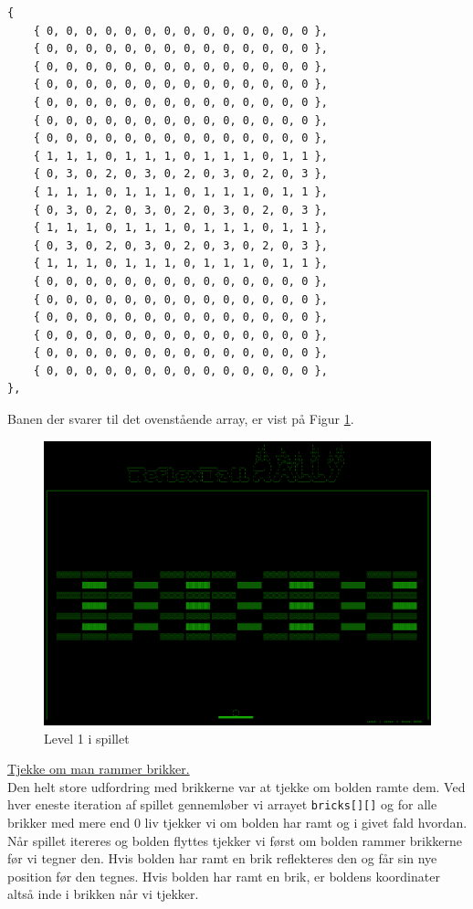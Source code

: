 \begin{lstlisting}
{ 
	{ 0, 0, 0, 0, 0, 0, 0, 0, 0, 0, 0, 0, 0, 0 },
	{ 0, 0, 0, 0, 0, 0, 0, 0, 0, 0, 0, 0, 0, 0 },
	{ 0, 0, 0, 0, 0, 0, 0, 0, 0, 0, 0, 0, 0, 0 },
	{ 0, 0, 0, 0, 0, 0, 0, 0, 0, 0, 0, 0, 0, 0 },
	{ 0, 0, 0, 0, 0, 0, 0, 0, 0, 0, 0, 0, 0, 0 },
	{ 0, 0, 0, 0, 0, 0, 0, 0, 0, 0, 0, 0, 0, 0 },
	{ 0, 0, 0, 0, 0, 0, 0, 0, 0, 0, 0, 0, 0, 0 },
	{ 1, 1, 1, 0, 1, 1, 1, 0, 1, 1, 1, 0, 1, 1 },
	{ 0, 3, 0, 2, 0, 3, 0, 2, 0, 3, 0, 2, 0, 3 },
	{ 1, 1, 1, 0, 1, 1, 1, 0, 1, 1, 1, 0, 1, 1 },
	{ 0, 3, 0, 2, 0, 3, 0, 2, 0, 3, 0, 2, 0, 3 },		
	{ 1, 1, 1, 0, 1, 1, 1, 0, 1, 1, 1, 0, 1, 1 },
	{ 0, 3, 0, 2, 0, 3, 0, 2, 0, 3, 0, 2, 0, 3 },
	{ 1, 1, 1, 0, 1, 1, 1, 0, 1, 1, 1, 0, 1, 1 },		
	{ 0, 0, 0, 0, 0, 0, 0, 0, 0, 0, 0, 0, 0, 0 },
	{ 0, 0, 0, 0, 0, 0, 0, 0, 0, 0, 0, 0, 0, 0 },
	{ 0, 0, 0, 0, 0, 0, 0, 0, 0, 0, 0, 0, 0, 0 },
	{ 0, 0, 0, 0, 0, 0, 0, 0, 0, 0, 0, 0, 0, 0 },
	{ 0, 0, 0, 0, 0, 0, 0, 0, 0, 0, 0, 0, 0, 0 },
	{ 0, 0, 0, 0, 0, 0, 0, 0, 0, 0, 0, 0, 0, 0 },
},
\end{lstlisting}
Banen der svarer til det ovenstående array, er vist på Figur \ref{fig:level1}. 

\begin{figure}[h!]
\centering
\includegraphics[scale=0.25]{figs/screenshots/level1.png}
\caption{Level 1 i spillet}
\label{fig:level1}
\end{figure}

\newpage

\underline{Tjekke om man rammer brikker.}\\

Den helt store udfordring med brikkerne var at tjekke om bolden ramte dem. Ved hver eneste iteration af spillet gennemløber vi arrayet \texttt{bricks[][]} og for alle brikker med mere end 0 liv tjekker vi om bolden har ramt og i givet fald hvordan.\\
Når spillet itereres og bolden flyttes tjekker vi først om bolden rammer brikkerne før vi tegner den. Hvis bolden har ramt en brik reflekteres den og får sin nye position før den tegnes. Hvis bolden har ramt en brik, er boldens koordinater altså inde i brikken når vi tjekker.\\

